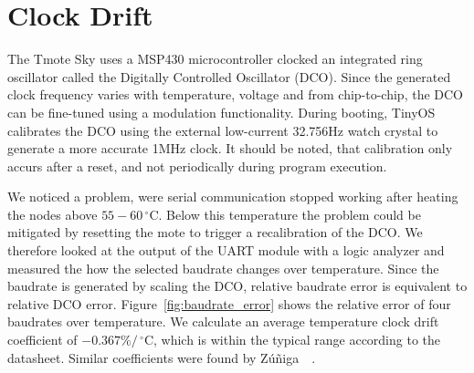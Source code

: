 \section{Clock Drift}

The Tmote Sky uses a MSP430 microcontroller clocked an integrated ring oscillator called the Digitally Controlled Oscillator (DCO).
Since the generated clock frequency varies with temperature, voltage and from chip-to-chip, the DCO can be fine-tuned using a modulation functionality.
During booting, TinyOS calibrates the DCO using the external low-current 32.756Hz watch crystal to generate a more accurate 1MHz clock.
It should be noted, that calibration only accurs after a reset, and not periodically during program execution.

We noticed a problem, were serial communication stopped working after heating the nodes above $55-60\,^{\circ}\mathrm{C}$. Below this temperature the problem could be mitigated by resetting the mote to trigger a recalibration of the DCO.
We therefore looked at the output of the UART module with a logic analyzer and measured the how the selected baudrate changes over temperature.
Since the baudrate is generated by scaling the DCO, relative baudrate error is equivalent to relative DCO error.
Figure~\ref{fig:baudrate_error} shows the relative error of four baudrates over temperature.
We calculate an average temperature clock drift coefficient of $-0.367\%/\,^{\circ}\mathrm{C}$, which is within the typical range according to the datasheet. Similar coefficients were found by Z{\'u}{\~n}iga~\etal~\cite{Zuniga2013}.


